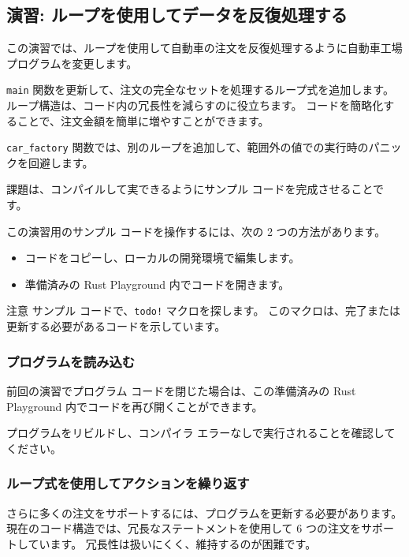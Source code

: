 \subsection{演習: ループを使用してデータを反復処理する}

この演習では、ループを使用して自動車の注文を反復処理するように自動車工場プログラムを変更します。

\texttt{main} 関数を更新して、注文の完全なセットを処理するループ式を追加します。 ループ構造は、コード内の冗長性を減らすのに役立ちます。 コードを簡略化することで、注文金額を簡単に増やすことができます。

\texttt{car\_factory} 関数では、別のループを追加して、範囲外の値での実行時のパニックを回避します。

課題は、コンパイルして実できるようにサンプル コードを完成させることです。

この演習用のサンプル コードを操作するには、次の 2 つの方法があります。

\begin{itemize}
\item コードをコピーし、ローカルの開発環境で編集します。
\item 準備済みの Rust Playground 内でコードを開きます。
\end{itemize}


\begin{itembox}[l]{注意}
サンプル コードで、\texttt{todo!} マクロを探します。 このマクロは、完了または更新する必要があるコードを示しています。
\end{itembox}

\subsubsection{プログラムを読み込む}

前回の演習でプログラム コードを閉じた場合は、この準備済みの Rust Playground 内でコードを再び開くことができます。

プログラムをリビルドし、コンパイラ エラーなしで実行されることを確認してください。

\subsubsection{ループ式を使用してアクションを繰り返す}

さらに多くの注文をサポートするには、プログラムを更新する必要があります。 現在のコード構造では、冗長なステートメントを使用して 6 つの注文をサポートしています。 冗長性は扱いにくく、維持するのが困難です。

